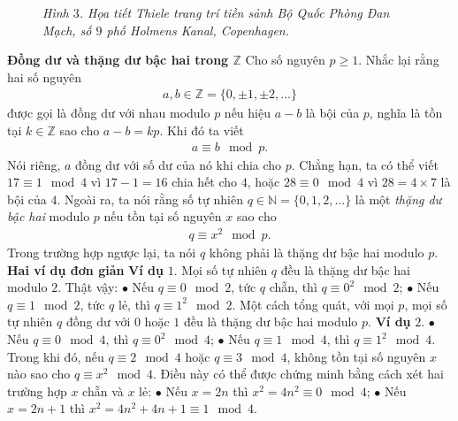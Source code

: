 \begin{multicols}{2}
\begin{figure}[H]
		\caption{\small\textit{\color{toanhocdoisong}Hình $3$. Họa tiết Thiele trang trí tiền sảnh Bộ Quốc Phòng Đan Mạch, số $9$ phố Holmens Kanal, Copenhagen.}}
		\vspace*{-10pt}
	\end{figure}
	\textbf{\color{toanhocdoisong}Đồng dư và thặng dư bậc hai trong $\pmb{\mathbb Z}$}
	\vskip 0.1cm
	Cho số nguyên $p \ge 1$. Nhắc lại rằng hai số nguyên
	\setlength{\abovedisplayskip}{5pt}
	\setlength{\belowdisplayskip}{5pt}
	\begin{align*}
		a, b \in \mathbb Z = \{ 0, \pm 1, \pm 2, \dots \}
	\end{align*}
	được gọi là đồng dư với nhau modulo $p$ nếu hiệu $a - b$ là bội của $p$, nghĩa là tồn tại $k \in \mathbb Z$ sao cho $a - b = kp$. Khi đó ta viết
	\begin{align*}
		a \equiv b \mod{p}.
	\end{align*}
	Nói riêng, $a$ đồng dư với số dư của nó khi chia cho $p$. Chẳng hạn, ta có thể viết $17 \equiv 1 \mod{4}$ vì $17 - 1 = 16$ chia hết cho $4$, hoặc $28 \equiv 0 \mod{4}$ vì $28 = 4 \times 7$ là bội của $4$.
	\vskip 0.1cm
	Ngoài ra, ta nói rằng số tự nhiên $q \in \mathbb N = \{ 0, 1, 2, \dots \}$ là một {\em thặng dư bậc hai} modulo $p$ nếu tồn tại số nguyên $x$ sao cho
	\begin{align*}
		q \equiv x^2 \mod{p}.
	\end{align*}
	Trong trường hợp ngược lại, ta nói $q$ không phải là thặng dư bậc hai modulo $p$.
	\vskip 0.1cm
	\textbf{\color{toanhocdoisong}Hai ví dụ đơn giản}
	\vskip 0.1cm
	\textbf{\color{toanhocdoisong}Ví dụ} $1.$ Mọi số tự nhiên $q$ đều là thặng dư bậc hai modulo $2$. Thật vậy:
	\vskip 0.1cm
	$\bullet$	Nếu $q \equiv 0 \mod{2}$, tức $q$ chẵn, thì $q \equiv 0^2 \mod{2}$;
	\vskip 0.1cm
	$\bullet$	Nếu $q \equiv 1 \mod{2}$, tức $q$ lẻ, thì $q \equiv 1^2 \mod{2}$.
	Một cách tổng quát, với mọi $p$, mọi số tự nhiên $q$ đồng dư với $0$ hoặc $1$ đều là thặng dư bậc hai modulo $p$.
	\vskip 0.1cm
	\textbf{\color{toanhocdoisong}Ví dụ} $2.$
	\vskip 0.1cm
	$\bullet$	Nếu $q \equiv 0 \mod{4}$, thì $q \equiv 0^2 \mod{4}$;
	\vskip 0.1cm
	$\bullet$	Nếu $q \equiv 1 \mod{4}$, thì $q \equiv 1^2 \mod{4}$.
	\vskip 0.1cm
	Trong khi đó, nếu $q \equiv 2 \mod{4}$ hoặc $q \equiv 3 \mod{4}$, không tồn tại số nguyên $x$ nào sao cho $q \equiv x^2 \mod{4}$. Điều này có thể được chứng minh bằng cách xét hai trường hợp $x$ chẵn và $x$ lẻ:
	\vskip 0.1cm
	$\bullet$	Nếu $x = 2n$ thì $x^2 = 4 n^2 \equiv 0 \mod{4}$;
	\vskip 0.2cm
	$\bullet$	Nếu $x = 2n + 1$ thì $x^2 = 4 n^2 + 4n + 1 \equiv 1 \mod{4}$.

\end{multicols}
